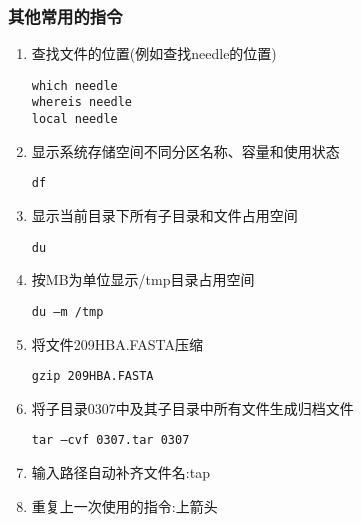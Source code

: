 \subsubsection{其他常用的指令}
\begin{enumerate}
    \item
          查找文件的位置(例如查找needle的位置)
          \begin{lstlisting}
which needle
whereis needle
local needle
\end{lstlisting}


    \item 显示系统存储空间不同分区名称、容量和使用状态
          \begin{lstlisting}
df
\end{lstlisting}


    \item 显示当前目录下所有子目录和文件占用空间
          \begin{lstlisting}
du
\end{lstlisting}

    \item 按MB为单位显示/tmp目录占用空间
          \begin{lstlisting}
du –m /tmp
\end{lstlisting}

    \item
          将文件209HBA.FASTA压缩
          \begin{lstlisting}
gzip 209HBA.FASTA
\end{lstlisting}

    \item 将子目录0307中及其子目录中所有文件生成归档文件
          \begin{lstlisting}
tar –cvf 0307.tar 0307
\end{lstlisting}

    \item 输入路径自动补齐文件名:tap
    \item 重复上一次使用的指令:上箭头


\end{enumerate}